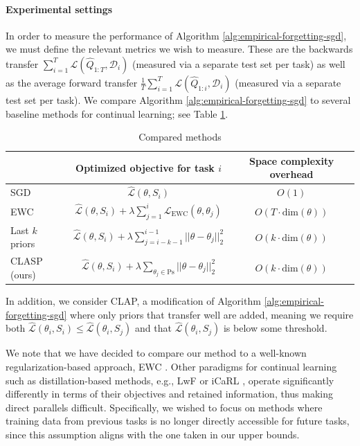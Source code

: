 \documentclass{article}
\theoremstyle{plain}
\theoremstyle{definition}
\theoremstyle{remark}
\begin{document}
\paragraph{Experimental settings}
In order to measure the performance of Algorithm \ref{alg:empirical-forgetting-sgd}, we must define the relevant metrics we wish to measure. These are the backwards transfer $\sum_{i=1}^{T}\mathcal{L}(\hat{Q}_{1:T}, \mathcal{D}_i)$ (measured via a separate test set per task) as well as the average forward transfer $\frac{1}{T}\sum_{i=1}^{T}\mathcal{L}(\hat{Q}_{1:i}, \mathcal{D}_i)$ (measured via a separate test set per task).
We compare Algorithm \ref{alg:empirical-forgetting-sgd} to several baseline methods for continual learning; see Table \ref{table:compared-methods}.
%
\begin{table}[h!]
\caption{Compared methods}  
\label{table:compared-methods}
\begin{center}
\begin{small}
\begin{sc}
\begin{tabular}{lcc}
\toprule
 & Optimized objective for task $i$ & Space complexity overhead  \\
\midrule
SGD  & $\hat{\mathcal{L}}(\theta, S_i)$ & $O(1)$  \\
EWC \citep{kirkpatrick2017overcoming} & $\hat{\mathcal{L}}(\theta, S_i)+\lambda \sum_{j=1}^i \mathcal{L}_{\mathrm{EWC}}(\theta, \theta_j)$ & $O(T\cdot \mathrm{dim}(\theta))$  \\
Last $k$ priors & $\hat{\mathcal{L}}(\theta,S_i)+\lambda\sum_{j=i-k-1}^{i-1} ||\theta-\theta_j||^2_2$ & $O(k\cdot \mathrm{dim}(\theta))$  \\
CLASP (ours) & $\hat{\mathcal{L}}(\theta,S_i)+\lambda\sum_{\theta_j\in \mathrm{Ps}} ||\theta-\theta_j||^2_2$ & $O(k\cdot \mathrm{dim}(\theta))$  \\
\bottomrule
\end{tabular}
\end{sc}
\end{small}
\end{center}
\end{table}

In addition, we consider CLAP, a modification of Algorithm \ref{alg:empirical-forgetting-sgd} where only priors that transfer well are added, meaning we require both $\hat{\mathcal{L}}(\theta_i, S_i)\leq \hat{\mathcal{L}}(\theta_i, S_j)$ and that $\hat{\mathcal{L}}(\theta_i, S_j)$ is below some threshold.

We note that we have decided to compare our method to a well-known regularization-based approach, EWC \citep{kirkpatrick2017overcoming}. Other paradigms for continual learning such as distillation-based methods, e.g., LwF \citep{li2017learning} or iCaRL \citep{rebuffi2017icarl}, operate significantly differently in terms of their objectives and retained information, thus making direct parallels difficult. Specifically, we wished to focus on methods where training data from previous tasks is no longer directly accessible for future tasks, since this assumption aligns with the one taken in our upper bounds.
\end{document}
